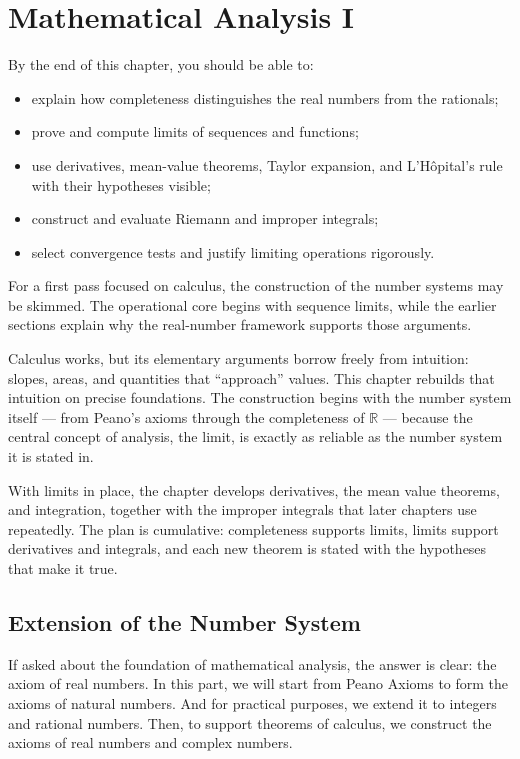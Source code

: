 \chapter{Mathematical Analysis I}

\begin{learningobjectives}
By the end of this chapter, you should be able to:
\begin{itemize}
    \item explain how completeness distinguishes the real numbers from the rationals;
    \item prove and compute limits of sequences and functions;
    \item use derivatives, mean-value theorems, Taylor expansion, and L'Hôpital's rule with their hypotheses visible;
    \item construct and evaluate Riemann and improper integrals;
    \item select convergence tests and justify limiting operations rigorously.
\end{itemize}
\end{learningobjectives}

\begin{mynote}
For a first pass focused on calculus, the construction of the number systems may be skimmed. The operational core begins with sequence limits, while the earlier sections explain why the real-number framework supports those arguments.
\end{mynote}

Calculus works, but its elementary arguments borrow freely from intuition: slopes, areas, and quantities that ``approach'' values. This chapter rebuilds that intuition on precise foundations. The construction begins with the number system itself — from Peano's axioms through the completeness of $\mathbb{R}$ — because the central concept of analysis, the limit, is exactly as reliable as the number system it is stated in.

With limits in place, the chapter develops derivatives, the mean value theorems, and integration, together with the improper integrals that later chapters use repeatedly. The plan is cumulative: completeness supports limits, limits support derivatives and integrals, and each new theorem is stated with the hypotheses that make it true.

\section{Extension of the Number System}
If asked about the foundation of mathematical analysis, the answer is clear: the axiom of real numbers. In this part, we will start from Peano Axioms to form the axioms of natural numbers. And for practical purposes, we extend it to integers and rational numbers. Then, to support theorems of calculus, we construct the axioms of real numbers and complex numbers.


